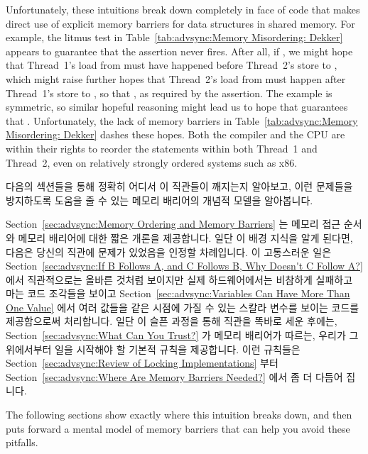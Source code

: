 Unfortunately, these intuitions break down completely in face of
code that makes direct use of explicit memory barriers for data structures
in shared memory.
For example, the litmus test in
Table~\ref{tab:advsync:Memory Misordering: Dekker}
appears to guarantee that the assertion never fires.
After all, if , we might hope that Thread~1's load from 
must have happened before Thread~2's store to , which might raise
further hopes that Thread~2's load from  must happen after
Thread~1's store to , so that , as required by the
assertion.
The example is symmetric, so similar hopeful reasoning might lead
us to hope that  guarantees that .
Unfortunately, the lack of memory barriers in
Table~\ref{tab:advsync:Memory Misordering: Dekker}
dashes these hopes.
Both the compiler and the CPU are within their rights to reorder
the statements within both Thread~1 and Thread~2, even on relatively
strongly ordered systems such as x86.
\fi

다음의 섹션들을 통해 정확히 어디서 이 직관들이 깨지는지 알아보고, 이런 문제들을
방지하도록 도움을 줄 수 있는 메모리 배리어의 개념적 모델을 알아봅니다.

Section~\ref{sec:advsync:Memory Ordering and Memory Barriers} 는 메모리 접근
순서와 메모리 배리어에 대한 짧은 개론을 제공합니다.
일단 이 배경 지식을 알게 된다면, 다음은 당신의 직관에 문제가 있었음을 인정할
차례입니다.
이 고통스러운 일은
Section~\ref{sec:advsync:If B Follows A, and C Follows B, Why Doesn't C Follow A?}
에서 직관적으로는 올바른 것처럼 보이지만 실제 하드웨어에서는 비참하게 실패하고
마는 코드 조각들을 보이고
Section~\ref{sec:advsync:Variables Can Have More Than One Value} 에서 여러
값들을 같은 시점에 가질 수 있는 스칼라 변수를 보이는 코드를 제공함으로써
처리합니다.
일단 이 슬픈 과정을 통해 직관을 똑바로 세운 후에는,
Section~\ref{sec:advsync:What Can You Trust?} 가 메모리 배리어가 따르는, 우리가
그 위에서부터 일을 시작해야 할 기본적 규칙을 제공합니다.
이런 규칙들은
Section~\ref{sec:advsync:Review of Locking Implementations}
부터 Section~\ref{sec:advsync:Where Are Memory Barriers Needed?} 에서 좀 더
다듬어 집니다.
\iffalse

The following sections show exactly where this intuition breaks down,
and then puts forward a mental model of memory barriers that can help
you avoid these pitfalls.

